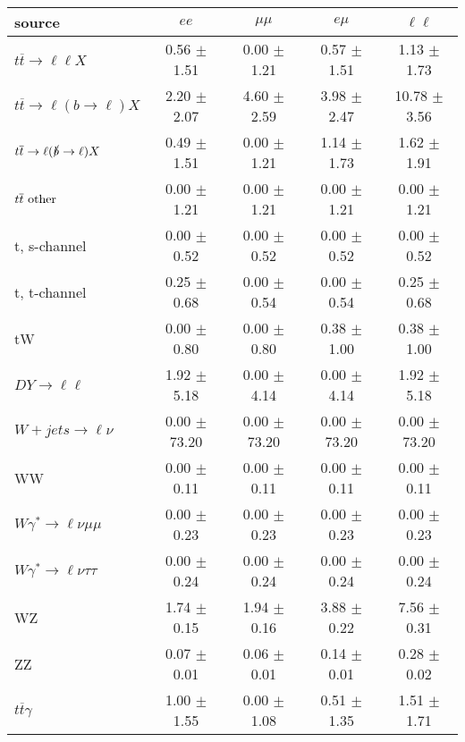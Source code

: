 \begin{tabular}{l|cccc} \hline\hline
source & $ee$ & $\mu\mu$ & $e\mu$ & $\ell\ell $ \\
\hline
$t\overline{t} \rightarrow \ell \ell X$ &  0.56 $\pm$  1.51 &  0.00 $\pm$  1.21 &  0.57 $\pm$  1.51 &  1.13 $\pm$  1.73 \\
$t\overline{t} \rightarrow \ell (b \rightarrow \ell) X$ &  2.20 $\pm$  2.07 &  4.60 $\pm$  2.59 &  3.98 $\pm$  2.47 & 10.78 $\pm$  3.56 \\
$t\overline{t} \rightarrow \ell (\slashed b \rightarrow \ell) X$ &  0.49 $\pm$  1.51 &  0.00 $\pm$  1.21 &  1.14 $\pm$  1.73 &  1.62 $\pm$  1.91 \\
        $t\overline{t}\ \rm{other}$ &  0.00 $\pm$  1.21 &  0.00 $\pm$  1.21 &  0.00 $\pm$  1.21 &  0.00 $\pm$  1.21 \\
\hline
                       t, s-channel &  0.00 $\pm$  0.52 &  0.00 $\pm$  0.52 &  0.00 $\pm$  0.52 &  0.00 $\pm$  0.52 \\
                       t, t-channel &  0.25 $\pm$  0.68 &  0.00 $\pm$  0.54 &  0.00 $\pm$  0.54 &  0.25 $\pm$  0.68 \\
                                 tW &  0.00 $\pm$  0.80 &  0.00 $\pm$  0.80 &  0.38 $\pm$  1.00 &  0.38 $\pm$  1.00 \\
\hline
         $DY \rightarrow \ell \ell$ &  1.92 $\pm$  5.18 &  0.00 $\pm$  4.14 &  0.00 $\pm$  4.14 &  1.92 $\pm$  5.18 \\
      $W+jets \rightarrow \ell \nu$ &  0.00 $\pm$ 73.20 &  0.00 $\pm$ 73.20 &  0.00 $\pm$ 73.20 &  0.00 $\pm$ 73.20 \\
                                 WW &  0.00 $\pm$  0.11 &  0.00 $\pm$  0.11 &  0.00 $\pm$  0.11 &  0.00 $\pm$  0.11 \\
\hline
$W\gamma^{*} \rightarrow \ell \nu \mu\mu$ &  0.00 $\pm$  0.23 &  0.00 $\pm$  0.23 &  0.00 $\pm$  0.23 &  0.00 $\pm$  0.23 \\
$W\gamma^{*} \rightarrow \ell \nu \tau\tau$ &  0.00 $\pm$  0.24 &  0.00 $\pm$  0.24 &  0.00 $\pm$  0.24 &  0.00 $\pm$  0.24 \\
                                 WZ &  1.74 $\pm$  0.15 &  1.94 $\pm$  0.16 &  3.88 $\pm$  0.22 &  7.56 $\pm$  0.31 \\
                                 ZZ &  0.07 $\pm$  0.01 &  0.06 $\pm$  0.01 &  0.14 $\pm$  0.01 &  0.28 $\pm$  0.02 \\
\hline
              $t\overline{t}\gamma$ &  1.00 $\pm$  1.55 &  0.00 $\pm$  1.08 &  0.51 $\pm$  1.35 &  1.51 $\pm$  1.71 \\

\end{tabular}
